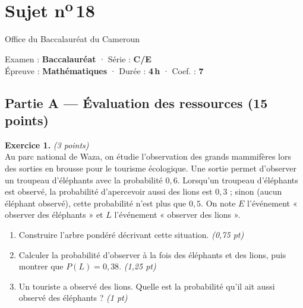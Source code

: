 \section{Sujet n\textsuperscript{o}\,18}
\noindent\begin{minipage}{0.5\linewidth}\footnotesize Office du Baccalauréat du Cameroun\end{minipage}%
\hfill\begin{minipage}{0.45\linewidth}\footnotesize\raggedleft Examen : \textbf{Baccalauréat} · Série : \textbf{C/E}\\
Épreuve : \textbf{Mathématiques} · Durée : \textbf{4\,h} · Coef. : \textbf{7}\end{minipage}
\par\smallskip{\color{onbo}\rule{\linewidth}{1pt}}

\subsection*{Partie A — Évaluation des ressources \hfill (15 points)}

\noindent\textbf{Exercice 1.} \hfill\textit{(3 points)}\\
Au parc national de Waza, on étudie l'observation des grands mammifères lors des
sorties en brousse pour le tourisme écologique. Une sortie permet d'observer un
troupeau d'éléphants avec la probabilité $0{,}6$. Lorsqu'un troupeau d'éléphants est
observé, la probabilité d'apercevoir aussi des lions est $0{,}3$ ; sinon (aucun
éléphant observé), cette probabilité n'est plus que $0{,}5$. On note $E$ l'événement
« observer des éléphants » et $L$ l'événement « observer des lions ».
\begin{enumerate}[label=\arabic*)]
\item Construire l'arbre pondéré décrivant cette situation. \hfill\textit{(0,75 pt)}
\item Calculer la probabilité d'observer à la fois des éléphants et des lions, puis
montrer que $P(L)=0{,}38$. \hfill\textit{(1,25 pt)}
\item Un touriste a observé des lions. Quelle est la probabilité qu'il ait aussi
observé des éléphants ? \hfill\textit{(1 pt)}
\end{enumerate}


